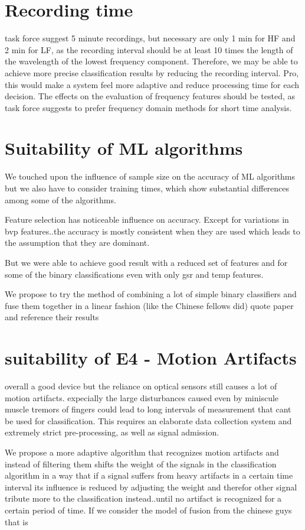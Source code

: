 \section{Recording time}
task force suggest 5 minute recordings, but necessary are only 1 min for HF and 2 min for LF, as the recording interval should be at least 10 times the length of the wavelength of the lowest frequency component.
Therefore, we may be able to achieve more precise classification results by reducing the recording interval. Pro, this would make a system feel more adaptive and reduce processing time for each decision. The effects on the evaluation of frequency features should be tested, as task force suggests to prefer frequency domain methods for short time analysis.
\section{Suitability of ML algorithms}
We touched upon the influence of sample size on the accuracy of ML algorithms but we also have to consider training times, which show substantial differences among some of the algorithms.

Feature selection has noticeable influence on accuracy. Except for variations in bvp features..the accuracy is mostly consistent when they are used which leads to the assumption that they are dominant.

But we were able to achieve good result with a reduced set of features and for some of the binary classifications even with only gsr and temp features.

We propose to try the method of combining a lot of simple binary classifiers and fuse them together in a linear fashion (like the Chinese fellows did) quote paper and reference their results

\section{suitability of E4 - Motion Artifacts}
overall a good device but the reliance on optical sensors still causes a lot of motion artifacts. expecially the large disturbances caused even by miniscule muscle tremors of fingers could lead to long intervals of measurement that cant be used for classification. This requires an elaborate data collection system and extremely strict pre-processing, as well as signal admission.

We propose a more adaptive algorithm that recognizes motion artifacts and instead of filtering them shifts the weight of the signals in the classification algorithm in a way that if a signal suffers from heavy artifacts in a certain time interval its influence is reduced by adjusting the weight and therefor other signal tribute more to the classification instead..until no artifact is recognized for a certain period of time. If we consider the model of fusion from the chinese guys that is

